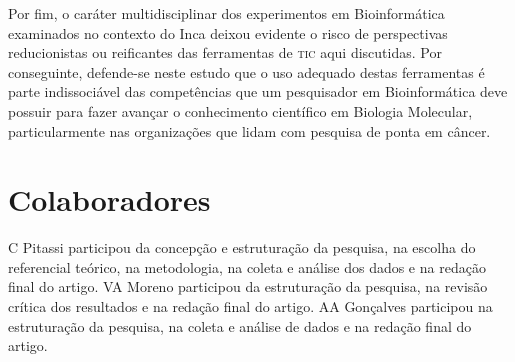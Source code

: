 \documentclass{article}
\begin{document}
Por fim, o caráter multidisciplinar dos experimentos em Bioinformática
examinados no contexto do Inca deixou evidente o risco de perspectivas
reducionistas ou reificantes das ferramentas de \textsc{tic} aqui discutidas. Por
conseguinte, defende-se neste estudo que o uso adequado destas ferramentas é
parte indissociável das competências que um pesquisador em Bioinformática deve
possuir para fazer avançar o conhecimento científico em Biologia Molecular,
particularmente nas organizações que lidam com pesquisa de ponta em câncer.

\section{Colaboradores}

C Pitassi participou da concepção e estruturação da pesquisa, na escolha do
referencial teórico, na metodologia, na coleta e análise dos dados e na redação
final do artigo. VA Moreno participou da estruturação da pesquisa, na revisão
crítica dos resultados e na redação final do artigo. AA Gonçalves participou na
estruturação da pesquisa, na coleta e análise de dados e na redação final do
artigo.
\end{document}
